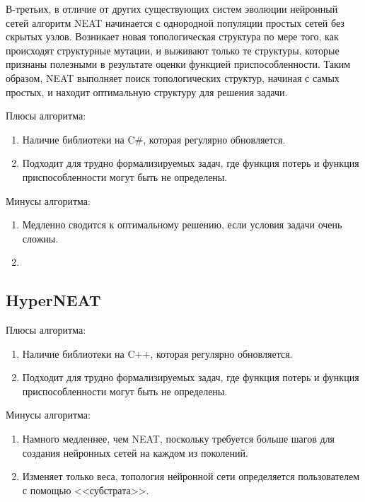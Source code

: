 В-третьих, в отличие от других существующих систем эволюции нейронный сетей алгоритм NEAT начинается с однородной популяции простых сетей без скрытых узлов. Возникает новая топологическая структура по мере того, как происходят структурные мутации, и выживают только те структуры, которые признаны полезными в результате оценки функцией приспособленности. Таким образом, NEAT выполняет поиск топологических структур, начиная с самых простых, и находит оптимальную структуру для решения задачи.



Плюсы алгоритма:
\begin{enumerate}[--]
    \item Наличие библиотеки на C\#, которая регулярно обновляется.
    \item Подходит для трудно формализируемых задач, где функция потерь и функция приспособленности могут быть не определены.
\end{enumerate}

Минусы алгоритма:
\begin{enumerate}[--]
    \item Медленно сводится к оптимальному решению, если условия задачи очень сложны. 
    \item 
\end{enumerate}

\subsection{HyperNEAT}


Плюсы алгоритма:
\begin{enumerate}[--]
    \item Наличие библиотеки на C++, которая регулярно обновляется.
    \item Подходит для трудно формализируемых задач, где функция потерь и функция приспособленности могут быть не определены.
\end{enumerate}

Минусы алгоритма:
\begin{enumerate}[--]
    \item Намного медленнее, чем NEAT, поскольку требуется больше шагов для создания нейронных сетей на каждом из поколений.
    \item Изменяет только веса, топология нейронной сети определяется пользователем с помощью <<субстрата>>.
\end{enumerate}








